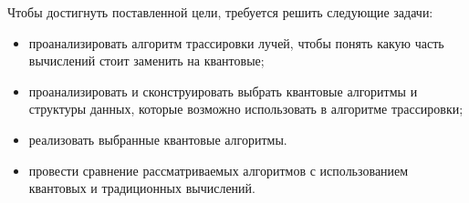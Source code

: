 Чтобы достигнуть поставленной цели, требуется решить следующие задачи:

\begin{itemize}
    \item проанализировать алгоритм трассировки лучей, чтобы понять какую часть вычислений стоит заменить на квантовые;
    \item проанализировать и сконструировать выбрать квантовые алгоритмы и структуры данных, которые возможно использовать в алгоритме трассировки;
    \item реализовать выбранные квантовые алгоритмы.
    \item провести сравнение рассматриваемых алгоритмов с использованием квантовых и традиционных вычислений.
\end{itemize}
